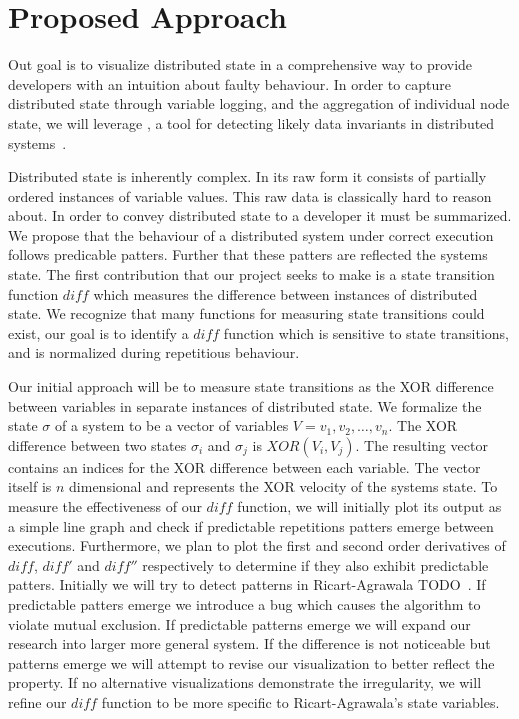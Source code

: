 \section{Proposed Approach}
\label{sec:proposed-approach}

Out goal is to visualize distributed state in a comprehensive way to provide
developers with an intuition about faulty behaviour. In order to capture
distributed state through variable logging, and the aggregation of individual
node state, we will leverage \dinv, a tool for detecting likely data invariants
in distributed systems~\cite{dinv}.

Distributed state is inherently complex. In its raw form it consists of
partially ordered instances of variable values. This raw data is classically
hard to reason about. In order to convey distributed state to a developer it
must be summarized. We propose that the behaviour of a distributed system under
correct execution follows predicable patters. Further that these patters are
reflected the systems state. The first contribution that our project seeks to
make is a state transition function $diff$ which measures the difference between
instances of distributed state. We recognize that many functions for measuring
state transitions could exist, our goal is to identify a $diff$ function which
is sensitive to state transitions, and is normalized during repetitious
behaviour.

Our initial approach will be to measure state transitions as the XOR difference
between variables in separate instances of distributed state. We formalize the
state $\sigma$ of a system to be a vector of variables $V =
{v_1,v_2,\dots,v_n}$. The XOR difference between two states $\sigma_i$ and
$\sigma_j$ is $XOR(V_i,V_j)$. The resulting vector contains an indices for the
XOR difference between each variable. The vector itself is $n$ dimensional and
represents the XOR velocity of the systems state. To measure the effectiveness
of our $diff$ function, we will initially plot its output as a simple line graph
and check if predictable repetitions patters emerge between executions.
Furthermore, we plan to plot the first and second order derivatives of $diff$,
$diff'$ and $diff''$ respectively to determine if they also exhibit predictable
patters. Initially we will try to detect patterns in Ricart-Agrawala
TODO~\cite{}. If predictable patters emerge we introduce a bug which causes
the algorithm to violate mutual exclusion. If predictable patterns emerge we
will expand our research into larger more general system. If the difference is
not noticeable but patterns emerge we will attempt to revise our visualization
to better reflect the property. If no alternative visualizations demonstrate
the irregularity, we will refine our $diff$ function to be more specific to
Ricart-Agrawala's state variables.
